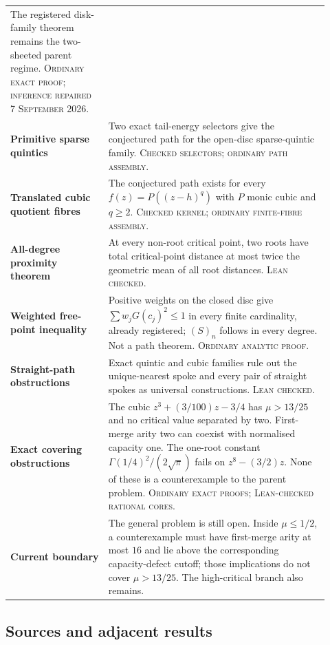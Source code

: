 {\begin{tabular}{@{}
  >{\raggedright\arraybackslash}p{0.29\linewidth}
  >{\raggedright\arraybackslash}p{0.63\linewidth}@{}}
The registered disk-family theorem remains the two-sheeted parent regime.
\textsc{Ordinary exact proof; inference repaired 7 September 2026.} \\
\addlinespace
\textbf{Primitive sparse quintics} &
Two exact tail-energy selectors give the conjectured path for the open-disc
sparse-quintic family.  \textsc{Checked selectors; ordinary path assembly.} \\
\addlinespace
\textbf{Translated cubic quotient fibres} &
The conjectured path exists for every $f(z)=P((z-h)^q)$ with $P$ monic cubic
and $q\ge2$.  \textsc{Checked kernel; ordinary finite-fibre assembly.} \\
\addlinespace
\textbf{All-degree proximity theorem} &
At every non-root critical point, two roots have total critical-point
distance at most twice the geometric mean of all root distances.
\textsc{Lean checked.} \\
\addlinespace
\textbf{Weighted free-point inequality} &
Positive weights on the closed disc give $\sum w_j G(c_j)^2\le 1$ in every
finite cardinality, already registered; $(S)_n$ follows in every degree.
Not a path theorem. \textsc{Ordinary analytic proof.} \\
\addlinespace
\textbf{Straight-path obstructions} &
Exact quintic and cubic families rule out the unique-nearest spoke and every
pair of straight spokes as universal constructions.  \textsc{Lean checked.} \\
\addlinespace
\textbf{Exact covering obstructions} &
The cubic $z^3+(3/100)z-3/4$ has $\mu>13/25$ and no critical value separated
by two.  First-merge arity two can coexist with normalised capacity one.
The one-root constant $\Gamma(1/4)^2/(2\sqrt{\pi})$ fails on
$z^8-(3/2)z$.  None of these is a counterexample to the parent problem.
\textsc{Ordinary exact proofs; Lean-checked rational cores.} \\
\addlinespace
\textbf{Current boundary} &
The general problem is still open.  Inside $\mu\le1/2$, a counterexample
must have first-merge arity at most $16$ and lie above the corresponding
capacity-defect cutoff; those implications do not cover $\mu>13/25$.  The
high-critical branch also remains. \\
\bottomrule
\end{tabular}}

\subsection*{Sources and adjacent results}
\label{sec:1041-sources}

